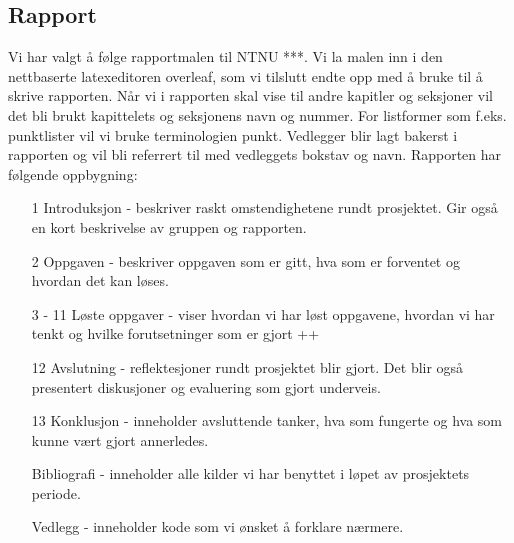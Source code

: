\subsection{Rapport}
Vi har valgt å følge rapportmalen til NTNU ***. Vi la malen inn i den nettbaserte latexeditoren overleaf, som vi tilslutt endte opp med å bruke til å skrive rapporten. Når vi i rapporten skal vise til andre kapitler og seksjoner vil det bli brukt kapittelets og seksjonens navn og nummer. For listformer som f.eks. punktlister vil vi bruke terminologien punkt. Vedlegger blir lagt bakerst i rapporten og vil bli referrert til med vedleggets bokstav og navn. Rapporten har følgende oppbygning:
\begin{itemize}
  \item[1] Introduksjon - beskriver raskt omstendighetene rundt prosjektet. Gir også en kort beskrivelse av gruppen og rapporten.
  \item[2] Oppgaven - beskriver oppgaven som er gitt, hva som er forventet og hvordan det kan løses.
  \item[3 - 11] Løste oppgaver - viser hvordan vi har løst oppgavene, hvordan vi har tenkt og hvilke forutsetninger som er gjort
 ++  \item[12] Avslutning - reflektesjoner rundt prosjektet blir gjort. Det blir også presentert diskusjoner og evaluering som gjort underveis.
  \item[13] Konklusjon - inneholder avsluttende tanker, hva som fungerte og hva som kunne vært gjort annerledes.
  \item[] Bibliografi - inneholder alle kilder vi har benyttet i løpet av prosjektets periode.
  \item[] Vedlegg - inneholder kode som vi ønsket å forklare nærmere.
\end{itemize}
